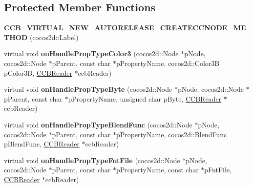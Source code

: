 \subsection*{Protected Member Functions}
\begin{DoxyCompactItemize}
\item 
\mbox{\label{classcocosbuilder_1_1LabelBMFontLoader_aacf124f45f6bd22cec1066fb355ebc8c}} 
{\bfseries C\+C\+B\+\_\+\+V\+I\+R\+T\+U\+A\+L\+\_\+\+N\+E\+W\+\_\+\+A\+U\+T\+O\+R\+E\+L\+E\+A\+S\+E\+\_\+\+C\+R\+E\+A\+T\+E\+C\+C\+N\+O\+D\+E\+\_\+\+M\+E\+T\+H\+OD} (cocos2d\+::\+Label)
\item 
\mbox{\label{classcocosbuilder_1_1LabelBMFontLoader_a2f2af6a97f778a2231867c8f3b84f852}} 
virtual void {\bfseries on\+Handle\+Prop\+Type\+Color3} (cocos2d\+::\+Node $\ast$p\+Node, cocos2d\+::\+Node $\ast$p\+Parent, const char $\ast$p\+Property\+Name, cocos2d\+::\+Color3B p\+Color3B, \hyperlink{classcocosbuilder_1_1CCBReader}{C\+C\+B\+Reader} $\ast$ccb\+Reader)
\item 
\mbox{\label{classcocosbuilder_1_1LabelBMFontLoader_a2991184ab3378ce9686f56b355d2a214}} 
virtual void {\bfseries on\+Handle\+Prop\+Type\+Byte} (cocos2d\+::\+Node $\ast$p\+Node, cocos2d\+::\+Node $\ast$p\+Parent, const char $\ast$p\+Property\+Name, unsigned char p\+Byte, \hyperlink{classcocosbuilder_1_1CCBReader}{C\+C\+B\+Reader} $\ast$ccb\+Reader)
\item 
\mbox{\label{classcocosbuilder_1_1LabelBMFontLoader_ad0c8e679645c0d7743070cae38ffc569}} 
virtual void {\bfseries on\+Handle\+Prop\+Type\+Blend\+Func} (cocos2d\+::\+Node $\ast$p\+Node, cocos2d\+::\+Node $\ast$p\+Parent, const char $\ast$p\+Property\+Name, cocos2d\+::\+Blend\+Func p\+Blend\+Func, \hyperlink{classcocosbuilder_1_1CCBReader}{C\+C\+B\+Reader} $\ast$ccb\+Reader)
\item 
\mbox{\label{classcocosbuilder_1_1LabelBMFontLoader_a73cee7c314b7a2383a39bf423f9b6b20}} 
virtual void {\bfseries on\+Handle\+Prop\+Type\+Fnt\+File} (cocos2d\+::\+Node $\ast$p\+Node, cocos2d\+::\+Node $\ast$p\+Parent, const char $\ast$p\+Property\+Name, const char $\ast$p\+Fnt\+File, \hyperlink{classcocosbuilder_1_1CCBReader}{C\+C\+B\+Reader} $\ast$ccb\+Reader)

\end{DoxyCompactItemize}
